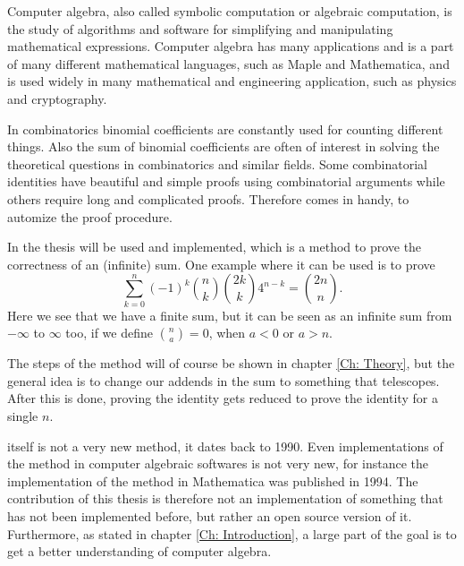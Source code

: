 Computer algebra, also called symbolic computation or algebraic computation, is the study of algorithms and software for simplifying and manipulating mathematical expressions. Computer algebra has many applications and is a part of many different mathematical languages, such as Maple and Mathematica, and is used widely in many mathematical and engineering application, such as physics and cryptography. 

In combinatorics binomial coefficients are constantly used for counting different things. Also the sum of binomial coefficients are often of interest in solving the theoretical questions in combinatorics and similar fields. Some combinatorial identities have beautiful and simple proofs using combinatorial arguments while others require long and complicated proofs. Therefore \WZ comes in handy, to automize the proof procedure.

In the thesis \WZ will be used and implemented, which is a method to prove the correctness of an (infinite) sum. One example where it can be used is to prove
\begin{equation}
  \sum_{k=0}^n (-1)^k\binom{n}{k}\binom{2k}{k}4^{n-k}=\binom{2n}{n}.
\end{equation}
Here we see that we have a finite sum, but it can be seen as an infinite sum from $-\infty$ to $\infty$ too, if we define $\binom{n}{a}=0$, when $a<0$ or $a>n$.

The steps of the method will of course be shown in chapter \ref{Ch: Theory}, but the general idea is to change our addends in the sum to something that telescopes. After this is done, proving the identity gets reduced to prove the identity for a single $n$.

\WZ itself is not a very new method, it dates back to 1990.  Even implementations of the method in computer algebraic softwares is not very new, for instance the implementation of the method in Mathematica was published in 1994.  The contribution of this thesis is therefore not an implementation of something that has not been implemented before, but rather an open source version of it. Furthermore, as stated in chapter \ref{Ch: Introduction}, a large part of the goal is to get a better understanding of computer algebra.

